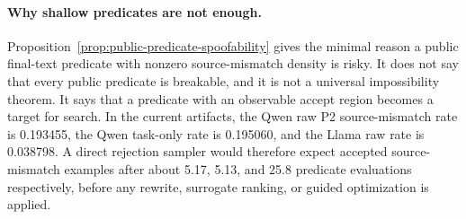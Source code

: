\paragraph{Why shallow predicates are not enough.}
Proposition~\ref{prop:public-predicate-spoofability} gives the minimal reason a
public final-text predicate with nonzero source-mismatch density is risky.  It
does not say that every public predicate is breakable, and it is not a
universal impossibility theorem.  It says that a predicate with an observable
accept region becomes a target for search.  In the current artifacts, the Qwen
raw P2 source-mismatch rate is 0.193455, the Qwen task-only rate is 0.195060,
and the Llama raw rate is 0.038798.  A direct rejection sampler would therefore
expect accepted source-mismatch examples after about 5.17, 5.13, and 25.8
predicate evaluations respectively, before any rewrite, surrogate ranking, or
guided optimization is applied.

